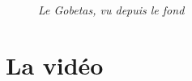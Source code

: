 \begin{center}
\begin{figure}[ht]
\caption{\label{equiProj}\textit{Le Gobetas, vu depuis le fond}}
\end{figure}
\end{center}
\chapter{La vidéo}
